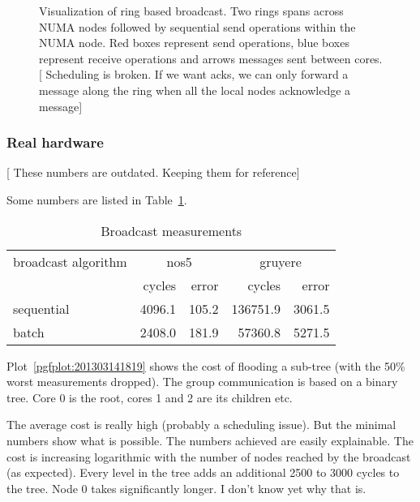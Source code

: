 \documentclass{article}
\newcommand{\stefan}[1]{
  {\color{skRed}[{\color{red}{SK}} #1]}}
\begin{document}
\begin{figure}[htb]
  \centering
  \begin{tikzpicture}[scale=.35,transform shape]
    
  \end{tikzpicture}
  \caption{Visualization of ring based broadcast. Two rings
    spans across NUMA nodes followed by sequential send operations
    within the NUMA node. %
    Red boxes represent send operations, blue boxes represent receive
    operations and arrows messages sent between
    cores. \stefan{Scheduling is broken. If we want acks, we can only
      forward a message along the ring when all the local nodes
      acknowledge a message}}
  \label{fig:visu_ring}
\end{figure}

\subsubsection{Real hardware}

\stefan{These numbers are outdated. Keeping them for reference}

Some numbers are listed in Table~\ref{tab:bc_measurements}.

\begin{table}[htb]
  \centering
  \begin{tabular}{lrrrr}
    \toprule
    broadcast algorithm & \multicolumn{2}{c}{nos5} & \multicolumn{2}{c}{gruyere} \\
      & cycles & error & cycles & error \\
    \midrule
    sequential &  4096.1 &  105.2 & 136751.9 &   3061.5 \\
    batch      &  2408.0 &  181.9 &  57360.8 &   5271.5 \\
    \bottomrule
  \end{tabular}
  \caption{Broadcast measurements}
  \label{tab:bc_measurements}
\end{table}

Plot~\ref{pgfplot:201303141819} shows the cost of flooding a sub-tree
(with the 50\% worst measurements dropped). The group communication is
based on a binary tree. Core 0 is the root, cores 1 and 2 are its
children etc.

The average cost is really high (probably a scheduling issue). But the
minimal numbers show what is possible. The numbers achieved are easily
explainable. The cost is increasing logarithmic with the number of
nodes reached by the broadcast (as expected). Every level in the tree
adds an additional 2500 to 3000 cycles to the tree. Node 0 takes
significantly longer. I don't know yet why that is.
\end{document}
